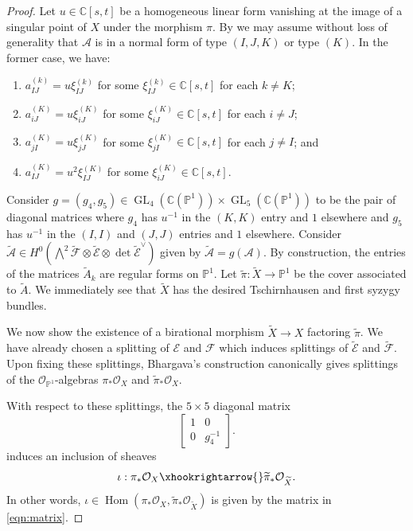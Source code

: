 \documentclass[11pt]{amsart}
\numberwithin{theorem}{section}
\numberwithin{equation}{section}
\theoremstyle{definition}\newtheorem{defn}[theorem]{Definition}
\theoremstyle{definition}\newtheorem{remark}[theorem]{Remark}
\theoremstyle{definition}\newtheorem{question}[theorem]{Question}
\theoremstyle{definition}\newtheorem{problem}[theorem]{Problem}
\newcommand{\CC}{\mathbb{C}}
\newcommand{\PP}{\mathbb{P}}
\newcommand{\cE}{\mathcal{E}}
\newcommand{\cF}{\mathcal{F}}
\newcommand{\cA}{\mathcal{A}}
\newcommand{\cO}{\mathcal{O}}
\DeclareMathOperator{\Hom}{Hom}
\DeclareMathOperator{\GL}{GL}
\newcommand{\I}{I}
\newcommand{\J}{J}
\newcommand{\K}{K}
\begin{document}
\begin{proof}
Let $u \in \CC[s,t]$ be a homogeneous linear form vanishing at the image of a singular point of $X$ under the morphism $\pi$. By  we may assume without loss of generality that $\cA$ is in a normal form of type $(\I,\J,\K)$ or type $(\K)$. In the former case, we have: 
\begin{enumerate}[label=(\roman*)]
    \item $a_{\I\J}^{(k)} = u \xi_{\I\J}^{(k)}$ for some $\xi_{\I\J}^{(k)} \in \CC[s,t]$ for each $k \neq \K$;
    \item $a_{i\J}^{(\K)} = u \xi_{i\J}^{(\K)}$ for some $\xi_{i \J}^{(\K)} \in \CC[s,t]$ for each $i \neq \J$;
    \item $a_{j\I}^{(\K)} = u \xi_{j\J}^{(\K)}$ for some $\xi_{j \I}^{(\K)} \in \CC[s,t]$ for each $j \neq \I$; and
    \item $a_{\I\J}^{(\K)} = u^2 \xi_{\I\J}^{(\K)}$ for some $\xi_{i \J}^{(\K)} \in \CC[s,t]$.
\end{enumerate}

Consider $g = (g_4, g_5) \in \GL_4(\CC(\PP^1)) \times \GL_5(\CC(\PP^1))$ to be the pair of diagonal matrices where $g_4$ has $u^{-1}$ in the $(\K, \K)$ entry and $1$ elsewhere and $g_5$ has $u^{-1}$ in the $(\I, \I)$ and $(\J, \J)$ entries and $1$ elsewhere. Consider $\widetilde{\cA} \in H^0(\bigwedge\nolimits^2 \widetilde{\cF} \otimes \widetilde{\cE} \otimes \det \widetilde{\cE}^\vee )$ given by $\widetilde{\cA} = g(\cA)$. By construction, the entries of the matrices $\widetilde{A}_k$ are regular forms on $\PP^1$. Let $\widetilde{\pi} : \widetilde{X} \rightarrow \PP^1$ be the cover associated to $\widetilde{A}$. We immediately see that $\widetilde{X}$ has the desired Tschirnhausen and first syzygy bundles. 

We now show the existence of a birational morphism $\widetilde{X} \rightarrow X$ factoring $\widetilde{\pi}$. We have already chosen a splitting of $\cE$ and $\cF$ which induces splittings of $\widetilde{\cE}$ and $\widetilde{\cF}$. Upon fixing these splittings, Bhargava's construction canonically gives splittings of the $\cO_{\PP^1}$-algebras $\pi_* \cO_X$ and $\widetilde{\pi}_* \cO_X$.

With respect to these splittings, the $5 \times 5$ diagonal matrix
\begin{equation}
\label{eqn:matrix}
    \begin{bmatrix}
        1 & 0 \\
        0 & g_{4}^{-1}
    \end{bmatrix}.
\end{equation}
induces an inclusion of sheaves
\begin{equation}
\label{eqn:inclusion}
\iota: \pi_* \cO_X \xhookrightarrow{} \widetilde{\pi}_* \cO_{\widetilde{X}}.
\end{equation}
In other words, $\iota \in \Hom(\pi_* \cO_X, \widetilde{\pi}_* \cO_{\widetilde{X}})$ is given by the matrix in \eqref{eqn:matrix}.


\end{proof}
\end{document}
